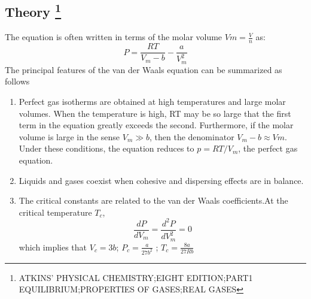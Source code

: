 \subsection*{Theory \footnote{ATKINS' PHYSICAL CHEMISTRY;EIGHT EDITION;PART1 EQUILIBRIUM;PROPERTIES OF GASES;REAL GASES}}
 The equation is often written in terms of
the molar volume $Vm = \frac{V}{n}$ as:
 $$P=\frac{RT}{V_m-b}-\frac{a}{V_m^2}$$
 The principal features of the van der Waals equation can be summarized as follows
 \begin{enumerate}
     \item Perfect gas isotherms are obtained at high temperatures and large molar volumes. When the temperature is high, RT may be so large that the first term in the equation greatly exceeds the second. Furthermore, if the molar volume is large in the sense $V_m \gg b$, then the denominator $V_m - b \approx Vm$. Under these conditions, the equation
        reduces to $p = RT/V_m$, the perfect gas equation.
        \item Liquids and gases coexist when cohesive and dispersing effects are in balance.
        \item The critical constants are related to the van der Waals coefficients.At the critical temperature $T_c$, $$ \frac{dP}{dV_m}=\frac{d^2P}{dV^2_m}=0$$ which implies that $V_c=3b$; $P_c=\frac{a}{27b^2}$ ; $T_c=\frac{8a}{27Rb}$

 \end{enumerate}

 
 


